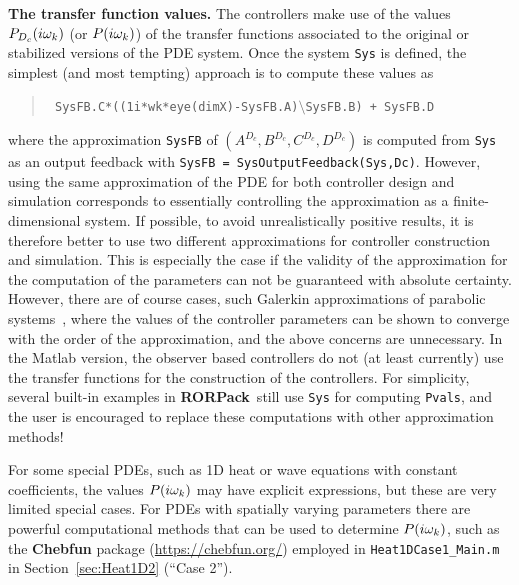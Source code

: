 \documentclass[11pt, a4paper]{amsart}
\theoremstyle{definition}
\numberwithin{equation}{section}
\newcommand{\RORname}{\textbf{RORPack}}
\begin{document}
\textbf{The transfer function values.} The controllers make use of the values  $P_{D_c}(i\omega_k)$ (or $P(i\omega_k)$)
of the transfer functions associated to the original or stabilized versions of the PDE system.
Once the system \texttt{Sys} is defined, the simplest (and most tempting) approach is to compute these values as
\begin{quotation}
\texttt{
SysFB.C*((1i*wk*eye(dimX)-SysFB.A)$\setminus$SysFB.B) + SysFB.D
}
\end{quotation}
where the approximation \texttt{SysFB} of $(A^{D_c},B^{D_c},C^{D_c},D^{D_c})$ is computed from \texttt{Sys} as an output feedback with \texttt{SysFB = SysOutputFeedback(Sys,Dc)}.
However, using the same approximation of the PDE for both controller design and simulation corresponds to essentially controlling the approximation as a finite-dimensional system. If possible, to avoid unrealistically positive results, it is therefore better to use two different approximations for controller construction and simulation. This is especially the case if the validity of the approximation for the computation of the parameters can not be guaranteed with absolute certainty. However, there are of course cases, such Galerkin approximations of parabolic systems~\cite{Mor94}, where the values of the controller parameters can be shown to converge with the order of the approximation, and the above concerns are unnecessary.
In the Matlab version, the observer based controllers do not (at least currently) use the transfer functions for the construction of the controllers.
For simplicity, several built-in examples in \RORname\ still use \texttt{Sys} for computing \texttt{Pvals}, and the user is encouraged to replace these computations with other approximation methods!

For some special PDEs, such as 1D heat or wave equations with constant coefficients, the values $P(i\omega_k)$ may have explicit expressions, but these are very limited special cases. 
 For PDEs with spatially varying parameters there are powerful computational methods that can be used to determine $P(i\omega_k)$, such as the \textbf{Chebfun} package (\href{https://chebfun.org/}{https://chebfun.org/}) employed in \texttt{Heat1DCase1\_Main.m} in Section~\ref{sec:Heat1D2} (``Case 2'').
\end{document}
